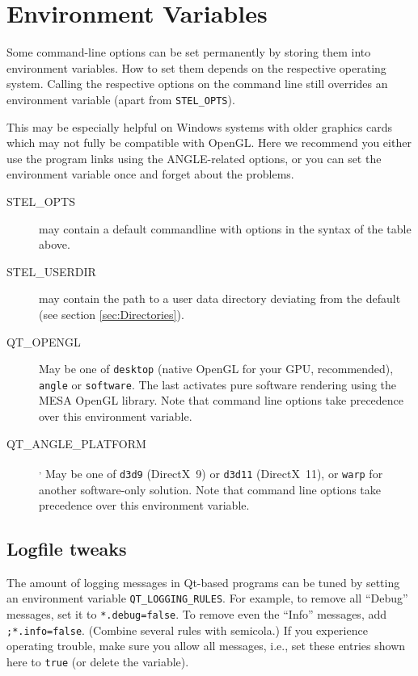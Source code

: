 \section{Environment Variables}
\label{sec:Environment}

Some command-line options can be set permanently by storing them into
environment variables. How to set them depends on the respective
operating system. Calling the respective options on the command line
still overrides an environment variable (apart from
\texttt{STEL\_OPTS}).

This may be especially helpful on Windows systems with older graphics
cards which may not fully be compatible with OpenGL. Here we recommend
you either use the program links using the ANGLE-related options, or
you can set the environment variable once and forget about the
problems.

\begin{description}
\item[STEL\_OPTS] may contain a default commandline with options in the syntax of the table above.
\item[STEL\_USERDIR] may contain the path to a user data directory
  deviating from the default (see section \ref{sec:Directories}).
\item[QT\_OPENGL] May be one of \texttt{desktop} (native OpenGL for your GPU, recommended),
  \texttt{angle} or \texttt{software}. The last activates pure software rendering using the MESA OpenGL library. Note that command line options take precedence over this environment variable.
\item[QT\_ANGLE\_PLATFORM]\textsuperscript{,} May be one of \texttt{d3d9} (DirectX~9) or \texttt{d3d11} (DirectX~11),
  or \texttt{warp} for another software-only solution. Note that command line options take precedence over this environment variable.
\end{description}

\subsection{Logfile tweaks}
\label{sec:Environment:Logfile}

The amount of logging messages in Qt-based programs can be tuned by setting an environment variable \texttt{QT\_LOGGING\_RULES}. 
For example, to remove all ``Debug'' messages, set it to \texttt{*.debug=false}. To remove even the ``Info'' messages, add \texttt{;*.info=false}. (Combine several rules with semicola.)
If you experience operating trouble, make sure you allow all messages, i.e., set these entries shown here to \texttt{true} (or delete the variable).

